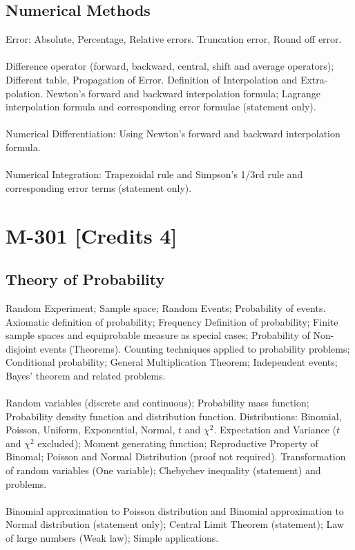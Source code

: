 \documentclass[12pt]{article}
\begin{document}
\subsection{Numerical Methods}
Error: Absolute, Percentage, Relative errors. Truncation error, Round off error.\\ \\
Difference operator (forward, backward, central, shift and average operators); Different table, Propagation of Error. Definition of Interpolation and Extra-polation. Newton's forward and backward interpolation formula; Lagrange interpolation formula and corresponding error formulae (statement only).\\ \\
Numerical Differentiation: Using Newton’s forward and backward interpolation formula.\\ \\
Numerical Integration: Trapezoidal rule and Simpson's 1/3rd rule and corresponding error terms (statement only).
\section{M-301 [Credits 4]}
\subsection{Theory of Probability}
Random Experiment; Sample space; Random Events; Probability of events. Axiomatic   definition of probability; Frequency Definition of probability; Finite sample  spaces and equiprobable measure as special cases; Probability of Non-disjoint  events (Theorems). Counting techniques applied to probability problems; Conditional probability; General Multiplication Theorem; Independent events;  Bayes’ theorem and related problems.\\ \\
Random variables (discrete and continuous); Probability mass function; Probability density function and distribution function. Distributions: Binomial, Poisson, Uniform, Exponential, Normal, $t$ and $\chi^2$. Expectation and Variance ($t$ and $\chi^2$ excluded); Moment generating function; Reproductive Property of Binomal; Poisson and Normal Distribution (proof not required). Transformation of random variables (One variable); Chebychev inequality (statement) and problems.\\ \\
Binomial approximation to Poisson distribution and Binomial approximation to Normal distribution (statement only); Central Limit Theorem (statement); Law of large numbers (Weak law); Simple applications.
\end{document}
